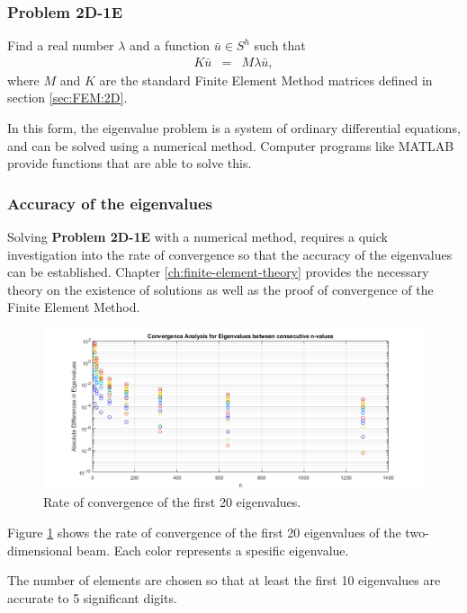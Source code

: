 \documentclass[../../main.tex]{subfiles}
\begin{document}
\subsubsection{Problem 2D-1E}
Find a real number $\lambda$ and a function $\bar{u} \in S^h$ such that
\begin{eqnarray}
	K\bar{u} & = & M\lambda{\bar{u}},
\end{eqnarray} where $M$ and $K$ are the standard Finite Element Method matrices defined in section \ref{sec:FEM:2D}.

In this form, the eigenvalue problem is a system of ordinary differential equations, and can be solved using a numerical method. Computer programs like MATLAB provide functions that are able to solve this.

\subsubsection{Accuracy of the eigenvalues}
Solving \textbf{Problem 2D-1E} with a numerical method, requires a quick investigation into the rate of convergence so that the accuracy of the eigenvalues can be established. Chapter \ref{ch:finite-element-theory} provides the necessary theory on the existence of solutions as well as the proof of convergence of the Finite Element Method.

\begin{figure}[H]
    \centering
    \begin{adjustbox}{center}
        \includegraphics[scale=0.7]{Convergence.png}
    \end{adjustbox}
    \caption{Rate of convergence of the first 20 eigenvalues.}
    \label{fig:conv_2d_eig}
\end{figure}


Figure \ref{fig:conv_2d_eig} shows the rate of convergence of the first 20 eigenvalues of the two-dimensional beam. Each color represents a spesific eigenvalue.

The number of elements are chosen so that at least the first 10 eigenvalues are accurate to 5 significant digits.
\end{document}
